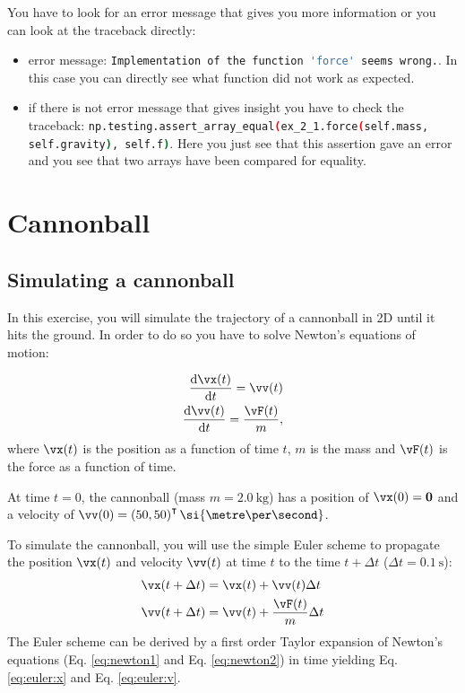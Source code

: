 You have to look for an error message that gives you more information or you can look at the traceback directly:
\begin{itemize}
    \item error message: \lstinline[language=bash]{Implementation of the function 'force' seems wrong.}. In this case you can directly see
          what function did not work as expected.
    \item if there is not error message that gives insight you have to check the traceback:
          \lstinline[language=bash]{np.testing.assert_array_equal(ex_2_1.force(self.mass, self.gravity), self.f)}. Here you just see that this assertion gave an error and you see that two arrays have been compared for equality.
\end{itemize}
\section{Cannonball}

\subsection{Simulating a cannonball}

In this exercise, you will simulate the trajectory of a cannonball in 2D until
it hits the ground. In order to do so you have to solve Newton's equations of motion:

\begin{align}
    \label{eq:newton1}
    \frac{\mathrm{d} \vx(t)}{\mathrm{d} t} = \vv(t)\\
    \label{eq:newton2}
    \frac{\mathrm{d} \vv(t)}{\mathrm{d} t} = \frac{\vF(t)}{m},
\end{align}
where $\vx(t)$ is the position as a function of time $t$, $m$ is the mass
and $\vF(t)$ is the force as a function of time.

At time $t=0$, the cannonball (mass $m=\SI{2.0}{\kilogram}$) has a position of
$\vx(0) = \mathbf{0}$ and a velocity of $\vv(0) =
\left(50,50\right)^\intercal \si{\metre\per\second}$.

To simulate the cannonball, you will use the simple Euler scheme to propagate
the position $\vx(t)$ and velocity $\vv(t)$ at time $t$ to the time $t+\Delta
t$ ($\Delta t = \SI{0.1}{\second}$):
  \begin{align}
    \label{eq:euler:x}
    \vx(t + \Delta t) &= \vx(t) + \vv(t) \Delta t\\
    \label{eq:euler:v}
    \vv(t + \Delta t) &= \vv(t)  + \frac{\vF(t)}{m} \Delta t
  \end{align}
The Euler scheme can be derived by a first order Taylor expansion of Newton's equations (Eq. \eqref{eq:newton1} and Eq. \eqref{eq:newton2}) in time
yielding Eq. \eqref{eq:euler:x} and Eq. \eqref{eq:euler:v}.

